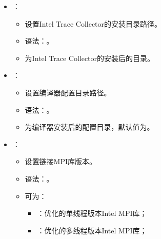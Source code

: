 \documentclass[a4paper,12pt,english]{sphinxmanual}
\begin{document}
\begin{itemize}
\begin{itemize}
\end{itemize}

\item {} 
\sphinxAtStartPar
{}：
\begin{itemize}
\item {} 
\sphinxAtStartPar
设置Intel Trace Collector的安装目录路径。

\item {} 
\sphinxAtStartPar
语法：。

\item {} 
\sphinxAtStartPar
{}为Intel Trace Collector的安装后的目录。

\end{itemize}

\item {} 
\sphinxAtStartPar
{}：
\begin{itemize}
\item {} 
\sphinxAtStartPar
设置编译器配置目录路径。

\item {} 
\sphinxAtStartPar
语法：。

\item {} 
\sphinxAtStartPar
{}为编译器安装后的配置目录，默认值为。

\end{itemize}

\item {} 
\sphinxAtStartPar
{}：
\begin{itemize}
\item {} 
\sphinxAtStartPar
设置链接MPI库版本。

\item {} 
\sphinxAtStartPar
语法：。

\item {} 
\sphinxAtStartPar
{}可为：
\begin{itemize}
\item {} 
\sphinxAtStartPar
{}：优化的单线程版本Intel MPI库；

\item {} 
\sphinxAtStartPar
{}：优化的多线程版本Intel MPI库；


\end{itemize}
\end{itemize}
\end{itemize}
\end{document}
